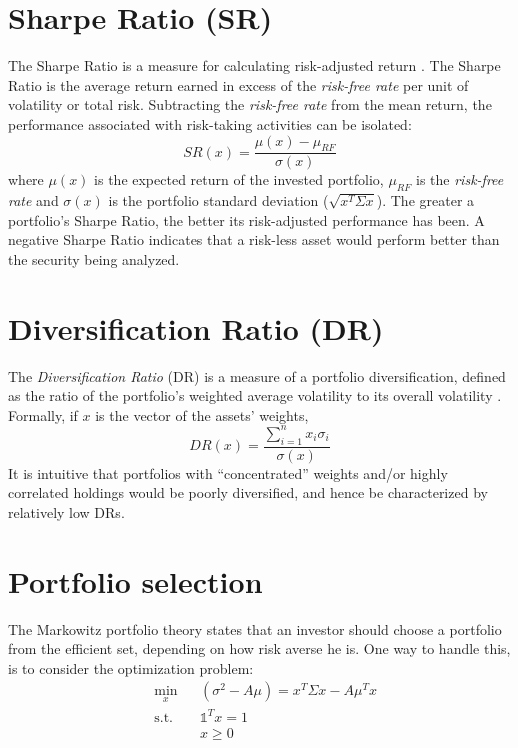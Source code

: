 \section{Sharpe Ratio (SR)}
The Sharpe Ratio is a measure for calculating risk-adjusted return \cite{sharpe}. The Sharpe Ratio is the average return earned in excess of the \textit{risk-free rate} per unit of volatility or total risk. Subtracting the \textit{risk-free rate} from the mean return, the performance associated with risk-taking activities can be isolated:
\begin{equation}\label{eq:SR}
SR(x) = \frac{\mu(x) - \mu_{RF}}{\sigma(x)}
\end{equation} 
where $\mu(x)$ is the expected return of the invested portfolio, $\mu_{RF}$ is the \textit{risk-free rate} and $\sigma(x)$ is the portfolio standard deviation ($\sqrt{x^T \Sigma x}$). The greater a portfolio's Sharpe Ratio, the better its risk-adjusted performance has been. A negative Sharpe Ratio indicates that a risk-less asset would perform better than the security being analyzed.

\section{Diversification Ratio (DR)}
The \textit{Diversification Ratio} (DR) is a measure of a portfolio diversification, defined as the ratio of the portfolio’s weighted
average volatility to its overall volatility \cite{diversification}. Formally, if $x$ is the vector of the assets' weights,
\begin{equation}\label{eq:dr}
DR(x) = \frac{\sum_{i=1}^{n}x_i\sigma_i}{\sigma(x)}
\end{equation}
It is intuitive that portfolios with “concentrated” weights and/or highly correlated holdings would be poorly diversified, and hence be characterized by relatively low DRs.

\section{Portfolio selection}
The Markowitz portfolio theory states that an investor should
choose a portfolio from the efficient set, depending on how risk averse he is. One way to handle this, is to consider the optimization problem\footnotemark[1]:
\begin{equation}
\begin{aligned}
&\min_x &&(\sigma^2 - A\mu) = x^T \Sigma x - A\mu^T x\\
&\text{s.t.}&&\mathds{1}^T x=1\\
&&&x \geq 0
\end{aligned}
\end{equation}

